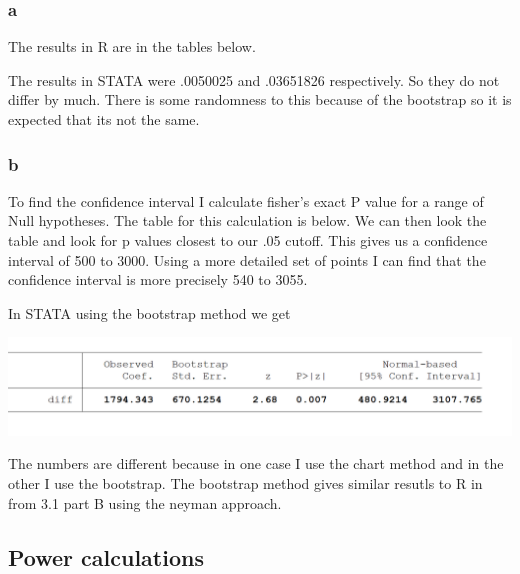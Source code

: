 \documentclass[11pt]{article}
\begin{document}
 \subsubsection{a}
 
 The results in R are in the tables below.
  \begin{center}
 	
 \end{center}
  \begin{center}
	
  \end{center}

The results in STATA were .0050025 and .03651826 respectively. So they do not differ by much. There is some randomness to this because of the bootstrap so it is expected that its not the same. 

 \subsubsection{b}
 To find the confidence interval I calculate fisher's exact P value for a range of Null hypotheses. The table for this calculation is below. We can then look the table and look for p values closest to our .05 cutoff. This gives us a confidence interval of 500 to 3000. Using a more detailed set of points I can find that the confidence interval is more precisely 540 to 3055.
 \begin{center}
 	
 \end{center}


In STATA using the bootstrap method we get 


 \begin{minipage}{\linewidth}
	\begin{center}
		\includegraphics[width=\linewidth]{stata_3_2_2_b.png}
	\end{center}
\end{minipage}

The numbers are different because in one case I use the chart method and in the other I use the bootstrap. The bootstrap method gives similar resutls to R in from 3.1 part B using the neyman approach. 



 
 \subsection{Power calculations}
\end{document}
